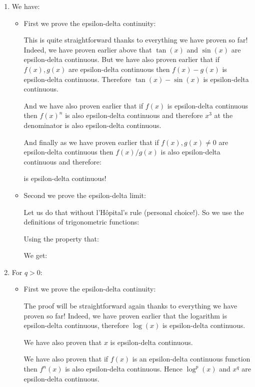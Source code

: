\begin{enumerate}
		
		
		\item We have:
		
		
		\begin{itemize}
			\item First we prove the epsilon-delta continuity:
			
			This is quite straightforward thanks to everything we have proven so far! Indeed, we have proven earlier above that $\tan(x)$ and $\sin(x)$ are epsilon-delta continuous. But we have also proven earlier that if $f(x),g(x)$ are epsilon-delta continuous then $f(x)-g(x)$ is epsilon-delta continuous. Therefore $\tan(x)-\sin(x)$ is  epsilon-delta continuous.
			
			And we have also proven earlier that if $f(x)$ is epsilon-delta continuous then $f(x)^n$ is also epsilon-delta continuous and therefore $x^3$ at the denominator is also epsilon-delta continuous.
			
			And finally as we have proven earlier that if $f(x),g(x)\neq 0$ are epsilon-delta continuous then $f(x)/g(x)$ is also epsilon-delta continuous and therefore:
			
			is epsilon-delta continuous!
			
			\item Second we prove the epsilon-delta limit:
			
			Let us do that without l'Hôpital's rule (personal choice!). So we use the definitions of trigonometric functions:
			
			Using the property that:
			
			We get:
			
		\end{itemize}
		
		\item For $q>0$:
		
		
		\begin{itemize}
			\item First we prove the epsilon-delta continuity:
			
			The proof will be straightforward again thanks to everything we have proven so far! Indeed, we have proven earlier that the logarithm is epsilon-delta continuous, therefore $\log(x)$ is epsilon-delta continuous.
			
			We have also proven that $x$ is epsilon-delta continuous.
			
			We have also proven that if $f(x)$ is an epsilon-delta continuous function then $f^n(x)$ is also epsilon-delta continuous. Hence $\log^p(x)$ and $x^q$ are epsilon-delta continuous.
			

\end{itemize}
\end{enumerate}
